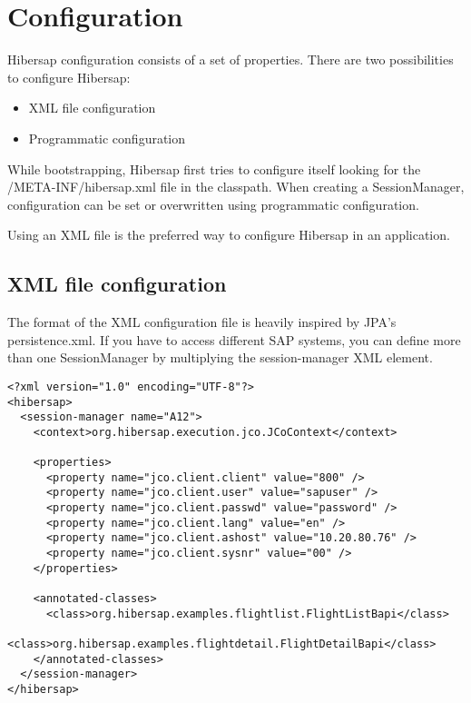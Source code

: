 \chapter{Configuration}
\label{cha:Configuration}

Hibersap configuration consists of a set of properties. 
There are two possibilities to configure Hibersap: 
\begin{itemize}
  \item XML file configuration 
  \item Programmatic configuration
\end{itemize}

While bootstrapping, Hibersap first tries to configure itself looking for the /META-INF/hibersap.xml file in the
classpath. When creating a SessionManager, configuration can be set or overwritten using programmatic configuration.

Using an XML file is the preferred way to configure Hibersap in an application.


\section{XML file configuration}
\label{sec:XML file configuration}

The format of the XML configuration file is heavily inspired by JPA's persistence.xml.
If you have to access different SAP systems, you can define more than one SessionManager by multiplying the
session-manager XML element.

\begin{Verbatim}[frame=single,label=hibersap.xml]
<?xml version="1.0" encoding="UTF-8"?>
<hibersap>
  <session-manager name="A12">
    <context>org.hibersap.execution.jco.JCoContext</context>

    <properties>
      <property name="jco.client.client" value="800" />
      <property name="jco.client.user" value="sapuser" />
      <property name="jco.client.passwd" value="password" />
      <property name="jco.client.lang" value="en" />
      <property name="jco.client.ashost" value="10.20.80.76" />
      <property name="jco.client.sysnr" value="00" />
    </properties>

    <annotated-classes>
      <class>org.hibersap.examples.flightlist.FlightListBapi</class>
      <class>org.hibersap.examples.flightdetail.FlightDetailBapi</class>
    </annotated-classes>
  </session-manager>
</hibersap>
\end{Verbatim}

